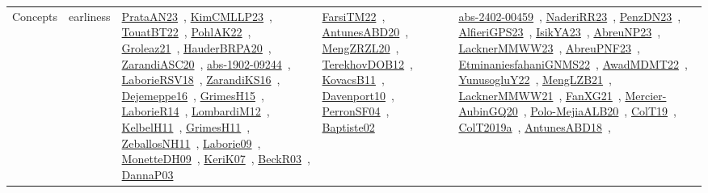 {\begin{longtable}{lp{3cm}>{\raggedright\arraybackslash}p{6cm}>{\raggedright\arraybackslash}p{6cm}>{\raggedright\arraybackslash}p{8cm}}
Concepts & earliness & \href{../works/PrataAN23.pdf}{PrataAN23}~\cite{PrataAN23}, \href{../works/KimCMLLP23.pdf}{KimCMLLP23}~\cite{KimCMLLP23}, \href{../works/TouatBT22.pdf}{TouatBT22}~\cite{TouatBT22}, \href{../works/PohlAK22.pdf}{PohlAK22}~\cite{PohlAK22}, \href{../works/Groleaz21.pdf}{Groleaz21}~\cite{Groleaz21}, \href{../works/HauderBRPA20.pdf}{HauderBRPA20}~\cite{HauderBRPA20}, \href{../works/ZarandiASC20.pdf}{ZarandiASC20}~\cite{ZarandiASC20}, \href{../works/abs-1902-09244.pdf}{abs-1902-09244}~\cite{abs-1902-09244}, \href{../works/LaborieRSV18.pdf}{LaborieRSV18}~\cite{LaborieRSV18}, \href{../works/ZarandiKS16.pdf}{ZarandiKS16}~\cite{ZarandiKS16}, \href{../works/Dejemeppe16.pdf}{Dejemeppe16}~\cite{Dejemeppe16}, \href{../works/GrimesH15.pdf}{GrimesH15}~\cite{GrimesH15}, \href{../works/LaborieR14.pdf}{LaborieR14}~\cite{LaborieR14}, \href{../works/LombardiM12.pdf}{LombardiM12}~\cite{LombardiM12}, \href{../works/KelbelH11.pdf}{KelbelH11}~\cite{KelbelH11}, \href{../works/GrimesH11.pdf}{GrimesH11}~\cite{GrimesH11}, \href{../works/ZeballosNH11.pdf}{ZeballosNH11}~\cite{ZeballosNH11}, \href{../works/Laborie09.pdf}{Laborie09}~\cite{Laborie09}, \href{../works/MonetteDH09.pdf}{MonetteDH09}~\cite{MonetteDH09}, \href{../works/KeriK07.pdf}{KeriK07}~\cite{KeriK07}, \href{../works/BeckR03.pdf}{BeckR03}~\cite{BeckR03}, \href{../works/DannaP03.pdf}{DannaP03}~\cite{DannaP03} & \href{../works/FarsiTM22.pdf}{FarsiTM22}~\cite{FarsiTM22}, \href{../works/AntunesABD20.pdf}{AntunesABD20}~\cite{AntunesABD20}, \href{../works/MengZRZL20.pdf}{MengZRZL20}~\cite{MengZRZL20}, \href{../works/TerekhovDOB12.pdf}{TerekhovDOB12}~\cite{TerekhovDOB12}, \href{../works/KovacsB11.pdf}{KovacsB11}~\cite{KovacsB11}, \href{../works/Davenport10.pdf}{Davenport10}~\cite{Davenport10}, \href{../works/PerronSF04.pdf}{PerronSF04}~\cite{PerronSF04}, \href{../works/Baptiste02.pdf}{Baptiste02}~\cite{Baptiste02} & \href{../works/abs-2402-00459.pdf}{abs-2402-00459}~\cite{abs-2402-00459}, \href{../works/NaderiRR23.pdf}{NaderiRR23}~\cite{NaderiRR23}, \href{../works/PenzDN23.pdf}{PenzDN23}~\cite{PenzDN23}, \href{../works/AlfieriGPS23.pdf}{AlfieriGPS23}~\cite{AlfieriGPS23}, \href{../works/IsikYA23.pdf}{IsikYA23}~\cite{IsikYA23}, \href{../works/AbreuNP23.pdf}{AbreuNP23}~\cite{AbreuNP23}, \href{../works/LacknerMMWW23.pdf}{LacknerMMWW23}~\cite{LacknerMMWW23}, \href{../works/AbreuPNF23.pdf}{AbreuPNF23}~\cite{AbreuPNF23}, \href{../works/EtminaniesfahaniGNMS22.pdf}{EtminaniesfahaniGNMS22}~\cite{EtminaniesfahaniGNMS22}, \href{../works/AwadMDMT22.pdf}{AwadMDMT22}~\cite{AwadMDMT22}, \href{../works/YunusogluY22.pdf}{YunusogluY22}~\cite{YunusogluY22}, \href{../works/MengLZB21.pdf}{MengLZB21}~\cite{MengLZB21}, \href{../works/LacknerMMWW21.pdf}{LacknerMMWW21}~\cite{LacknerMMWW21}, \href{../works/FanXG21.pdf}{FanXG21}~\cite{FanXG21}, \href{../works/Mercier-AubinGQ20.pdf}{Mercier-AubinGQ20}~\cite{Mercier-AubinGQ20}, \href{../works/Polo-MejiaALB20.pdf}{Polo-MejiaALB20}~\cite{Polo-MejiaALB20}, \href{../works/ColT19.pdf}{ColT19}~\cite{ColT19}, \href{../works/ColT2019a.pdf}{ColT2019a}~\cite{ColT2019a}, \href{../works/AntunesABD18.pdf}{AntunesABD18}~\cite{AntunesABD18}, 
\end{longtable}}
